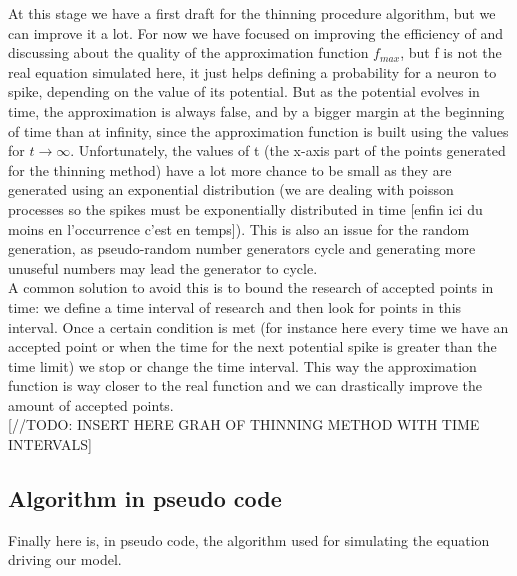 	At this stage we have a first draft for the thinning procedure algorithm, but we can improve it a lot. For now we have focused on improving the efficiency of and discussing about the quality of the approximation function $f_{max}$, but f is not the real equation simulated here, it just helps defining a probability for a neuron to spike, depending on the value of its potential. But as the potential evolves in time, the approximation is always false, and by a bigger margin at the beginning of time than at infinity, since the approximation function is built using the values for $t\rightarrow\infty$. Unfortunately, the values of t (the x-axis part of the points generated for the thinning method) have a lot more chance to be small as they are generated using an exponential distribution (we are dealing with poisson processes so the spikes must be exponentially distributed in time [enfin ici du moins en l'occurrence c'est en temps]). This is also an issue for the random generation, as pseudo-random number generators cycle and generating more unuseful numbers may lead the generator to cycle.\\

	A common solution to avoid this is to bound the research of accepted points in time: we define a time interval of research and then look for points in this interval. Once a certain condition is met (for instance here every time we have an accepted point or when the time for the next potential spike is greater than the time limit) we stop or change the time interval. This way the approximation function is way closer to the real function and we can drastically improve the amount of accepted points.\\

	[//TODO: INSERT HERE GRAH OF THINNING METHOD WITH TIME INTERVALS]

\subsection{Algorithm in pseudo code}
	Finally here is, in pseudo code, the algorithm used for simulating the equation driving our model.\\

